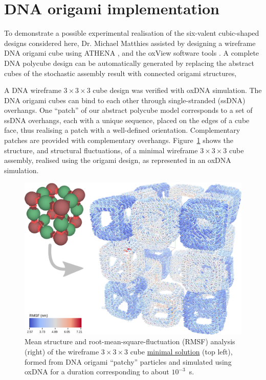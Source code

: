 \FloatBarrier
\section{DNA origami implementation}
To demonstrate a possible experimental realisation of the six-valent cubic-shaped designs considered here, Dr. Michael Matthies assisted by designing a wireframe DNA origami cube using ATHENA \cite{athena}, and the oxView software tools \cite{poppleton2020design, bohlin2022oxview}. A complete DNA polycube design can be automatically generated by replacing the abstract cubes of the stochastic assembly result with connected origami structures,

A DNA wireframe \(3 \times 3 \times 3\) cube design was verified with oxDNA \cite{vsulc2012sequence,Snodin2015,ouldridge2011structural} simulation. The DNA origami cubes can bind to each other through single-stranded (ssDNA) overhangs. One ``patch'' of our abstract polycube model corresponds to a set of ssDNA overhangs, each with a unique sequence, placed on the edges of a cube face, thus realising a patch with a well-defined orientation. Complementary patches are provided with complementary overhangs. Figure~\ref{fig:hollowCubeDNA} shows the structure, and structural fluctuations, of a minimal wireframe $3\times3\times3$ cube assembly, realised using the origami design, as represented in an oxDNA simulation.

\begin{figure}[h]
    \centering
    \includegraphics[width=\linewidth]{figures/DNA_polycube.png}
    \caption{Mean structure and root-mean-square-fluctuation (RMSF) analysis (right) of the wireframe \(3 \times 3 \times 3\) cube \href{https://akodiat.github.io/polycubes/?assemblyMode=stochastic&rule=070000070500868700000000}{minimal solution} (top left), formed from DNA origami ``patchy'' particles and simulated using oxDNA for a duration corresponding to about $10^{-3}$~s.
    }
    \label{fig:hollowCubeDNA}
\end{figure}


